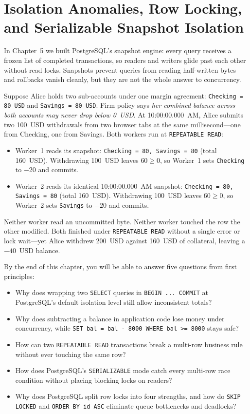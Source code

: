 \chapter{Isolation Anomalies, Row Locking, and Serializable Snapshot Isolation}

In Chapter~5 we built PostgreSQL's snapshot engine: every query receives a frozen list of completed transactions, so readers and writers glide past each other without read locks. Snapshots prevent queries from reading half-written bytes and rollbacks vanish cleanly, but they are not the whole answer to concurrency.

Suppose Alice holds two sub-accounts under one margin agreement: \texttt{Checking = 80~USD} and \texttt{Savings = 80~USD}. Firm policy says \emph{her combined balance across both accounts may never drop below 0~USD}. At 10:00:00.000~AM, Alice submits two 100~USD withdrawals from two browser tabs at the same millisecond---one from Checking, one from Savings. Both workers run at \texttt{REPEATABLE READ}:
\begin{itemize}
  \item Worker~1 reads its snapshot: \texttt{Checking = 80, Savings = 80} (total 160~USD). Withdrawing 100~USD leaves $60 \ge 0$, so Worker~1 sets \texttt{Checking} to $-20$ and commits.
  \item Worker~2 reads its identical 10:00:00.000~AM snapshot: \texttt{Checking = 80, Savings = 80} (total 160~USD). Withdrawing 100~USD leaves $60 \ge 0$, so Worker~2 sets \texttt{Savings} to $-20$ and commits.
\end{itemize}
Neither worker read an uncommitted byte. Neither worker touched the row the other modified. Both finished under \texttt{REPEATABLE READ} without a single error or lock wait---yet Alice withdrew 200~USD against 160~USD of collateral, leaving a $-40$~USD balance.

\begin{focusbox}
By the end of this chapter, you will be able to answer five questions from first principles:
\begin{itemize}
  \item Why does wrapping two \texttt{SELECT} queries in \texttt{BEGIN ... COMMIT} at PostgreSQL's default isolation level still allow inconsistent totals?
  \item Why does subtracting a balance in application code lose money under concurrency, while \texttt{SET bal = bal - 8000 WHERE bal >= 8000} stays safe?
  \item How can two \texttt{REPEATABLE READ} transactions break a multi-row business rule without ever touching the same row?
  \item How does PostgreSQL's \texttt{SERIALIZABLE} mode catch every multi-row race condition without placing blocking locks on readers?
  \item Why does PostgreSQL split row locks into four strengths, and how do \texttt{SKIP LOCKED} and \texttt{ORDER BY id ASC} eliminate queue bottlenecks and deadlocks?
\end{itemize}
\end{focusbox}

